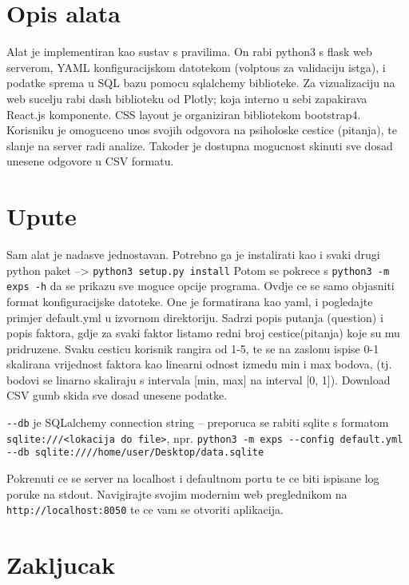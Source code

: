\documentclass[times, utf8, seminar]{fer}
\begin{document}
\chapter{Opis alata}
Alat je implementiran kao sustav s pravilima. On rabi python3 s flask web serverom, YAML konfiguracijskom datotekom (volptous za validaciju istga), i podatke sprema u SQL bazu pomocu sqlalchemy biblioteke. Za vizualizaciju na web sucelju rabi dash biblioteku od Plotly; koja interno u sebi zapakirava React.js komponente. CSS layout je organiziran bibliotekom bootstrap4. Korisniku je omoguceno unos svojih odgovora na psiholoske cestice (pitanja), te slanje na server radi analize. Takoder je dostupna mogucnost skinuti sve dosad unesene odgovore u CSV formatu.

\chapter{Upute}

Sam alat je nadasve jednostavan.
Potrebno ga je instalirati kao i svaki drugi python paket --> \verb|python3 setup.py install|  Potom se pokrece s \verb|python3 -m exps -h| da se prikazu sve moguce opcije programa.
Ovdje ce se samo objasniti format konfiguracijske datoteke.
One je formatirana kao yaml, i pogledajte primjer default.yml u izvornom direktoriju.
Sadrzi popis putanja (question) i popis faktora, gdje za svaki faktor listamo redni broj cestice(pitanja) koje su mu pridruzene.
Svaku cesticu korisnik rangira od 1-5, te se na zaslonu ispise 0-1 skalirana vrijednost faktora kao linearni odnost izmedu min i max bodova, (tj. bodovi se linarno skaliraju s intervala [min, max] na interval [0, 1]).
Download CSV gumb skida sve dosad unesene podatke.

\verb|--db| je SQLalchemy connection string -- preporuca se rabiti sqlite s formatom \verb|sqlite:///<lokacija do file>|, npr. \verb|python3 -m exps --config default.yml --db sqlite:////home/user/Desktop/data.sqlite|

Pokrenuti ce se server na localhost i defaultnom portu te ce biti ispisane log poruke na stdout. Navigirajte svojim modernim web preglednikom na \verb|http://localhost:8050| te ce vam se otvoriti aplikacija.

\chapter{Zakljucak}



\end{document}
